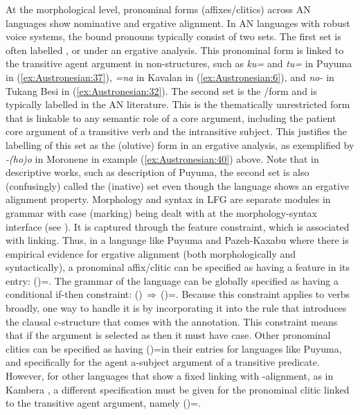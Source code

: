 \documentclass[output=paper,chinesefont]{../langscibook}
\begin{document}
At the morphological level, pronominal forms (affixes/clitics) across AN languages show nominative and ergative alignment. In AN languages with robust voice systems, the bound pronouns typically consist of two sets. The first set is often labelled \GEN, or \ERG under an ergative analysis. This pronominal form is linked to the transitive agent argument in non-\AV structures, such as \emph{ku=} and \emph{tu=} in Puyuma in (\ref{ex:Austronesian:37}), \emph{=na} in Kavalan in (\ref{ex:Austronesian:6}), and \emph{no-} in Tukang Besi in (\ref{ex:Austronesian:32}). The second set is the \SUBJ/\PIVOT form and is typically labelled \NOM in the AN literature. This is the thematically unrestricted form that is linkable to any semantic role of a core argument, including the patient core argument of a transitive verb and the intransitive subject. This justifies the labelling of this set as the {\ABS}(olutive) form in an ergative analysis, as exemplified by \emph{-(ho)o} in Moronene in example (\ref{ex:Austronesian:40}) above. Note that in descriptive works, such as  description of Puyuma, the second set is also (confusingly) called the \NOM{}(inative) set even though the language shows an ergative alignment property. Morphology and syntax in LFG are separate modules in grammar with case (marking) being dealt with at the morphology-syntax interface (see \citealt{BM87}). It is captured through the \CASE feature constraint, which is associated with \GF linking. Thus, in a language like Puyuma and Pazeh-Kaxabu where there is empirical evidence for ergative alignment (both morphologically and syntactically), a pronominal affix/clitic can be specified as having a \CASE feature in its entry: (\UP\CASE)=\ABS. The grammar of the language can be globally specified as having a conditional if-then constraint: (\UP\SUBJ)\,$\Rightarrow$\,(\UP\SUBJ\CASE)=\ABS. Because this constraint applies to verbs broadly, one way to handle it is by incorporating it into the rule that introduces the clausal c-structure that comes with the \SUBJ annotation. This constraint means that if the argument is selected as \SUBJ then it must have \ABS case. Other pronominal clitics can be specified as having (\UP\CASE)=\ERG in their entries for languages like Puyuma, and specifically for the agent a-subject argument of a transitive predicate. However, for other languages that show a \SUBJ fixed linking with \NOM-\ACC alignment, as in Kambera \citep[73]{Klamer1998}, a different specification must be given for the pronominal clitic linked to the transitive agent argument, namely (\UP\CASE)=\NOM.
\end{document}
